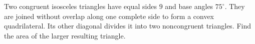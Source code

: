 Two congruent isosceles triangles have equal sides $9$ and base angles $75^\circ$. They are joined without overlap along one complete side to form a convex quadrilateral. Its other diagonal divides it into two noncongruent triangles. Find the area of the larger resulting triangle.
